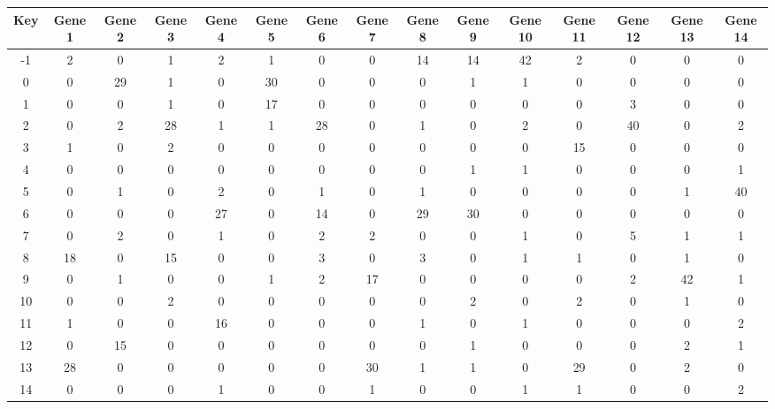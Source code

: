 \begin{tabular}{|c|c|c|c|c|c|c|c|c|c|c|c|c|c|c|}
\hline
Key & Gene 1 & Gene 2 & Gene 3 & Gene 4 & Gene 5 & Gene 6 & Gene 7 & Gene 8 & Gene 9 & Gene 10 & Gene 11 & Gene 12 & Gene 13 & Gene 14 \\
\hline
-1 & 2 & 0 & 1 & 2 & 1 & 0 & 0 & 14 & 14 & 42 & 2 & 0 & 0 & 0 \\
0 & 0 & 29 & 1 & 0 & 30 & 0 & 0 & 0 & 1 & 1 & 0 & 0 & 0 & 0 \\
1 & 0 & 0 & 1 & 0 & 17 & 0 & 0 & 0 & 0 & 0 & 0 & 3 & 0 & 0 \\
2 & 0 & 2 & 28 & 1 & 1 & 28 & 0 & 1 & 0 & 2 & 0 & 40 & 0 & 2 \\
3 & 1 & 0 & 2 & 0 & 0 & 0 & 0 & 0 & 0 & 0 & 15 & 0 & 0 & 0 \\
4 & 0 & 0 & 0 & 0 & 0 & 0 & 0 & 0 & 1 & 1 & 0 & 0 & 0 & 1 \\
5 & 0 & 1 & 0 & 2 & 0 & 1 & 0 & 1 & 0 & 0 & 0 & 0 & 1 & 40 \\
6 & 0 & 0 & 0 & 27 & 0 & 14 & 0 & 29 & 30 & 0 & 0 & 0 & 0 & 0 \\
7 & 0 & 2 & 0 & 1 & 0 & 2 & 2 & 0 & 0 & 1 & 0 & 5 & 1 & 1 \\
8 & 18 & 0 & 15 & 0 & 0 & 3 & 0 & 3 & 0 & 1 & 1 & 0 & 1 & 0 \\
9 & 0 & 1 & 0 & 0 & 1 & 2 & 17 & 0 & 0 & 0 & 0 & 2 & 42 & 1 \\
10 & 0 & 0 & 2 & 0 & 0 & 0 & 0 & 0 & 2 & 0 & 2 & 0 & 1 & 0 \\
11 & 1 & 0 & 0 & 16 & 0 & 0 & 0 & 1 & 0 & 1 & 0 & 0 & 0 & 2 \\
12 & 0 & 15 & 0 & 0 & 0 & 0 & 0 & 0 & 1 & 0 & 0 & 0 & 2 & 1 \\
13 & 28 & 0 & 0 & 0 & 0 & 0 & 30 & 1 & 1 & 0 & 29 & 0 & 2 & 0 \\
14 & 0 & 0 & 0 & 1 & 0 & 0 & 1 & 0 & 0 & 1 & 1 & 0 & 0 & 2 \\
\hline
\end{tabular}